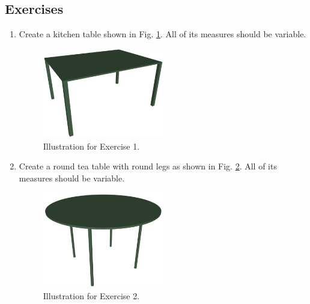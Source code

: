 \documentclass{article}
\begin{document}
\subsection{Exercises}

\begin{enumerate}
\item 
Create a kitchen table shown in Fig. \ref{fig:b1}. All of its measures should be variable.

\newpage

\begin{figure}[!ht]
\begin{center}
\includegraphics[width=0.5\textwidth]{img/kitchentable.png}
\end{center}
\vspace{-2mm}
\caption{Illustration for Exercise 1.}
\label{fig:b1}
\end{figure}

\item Create a round tea table with round legs as
shown in Fig. \ref{fig:b2}. All of its measures should be variable.

\begin{figure}[!ht]
\begin{center}
\includegraphics[width=0.5\textwidth]{img/teatable.png}
\end{center}
\vspace{-2mm}
\caption{Illustration for Exercise 2.}
\label{fig:b2}
\end{figure}


\end{enumerate}
\end{document}
